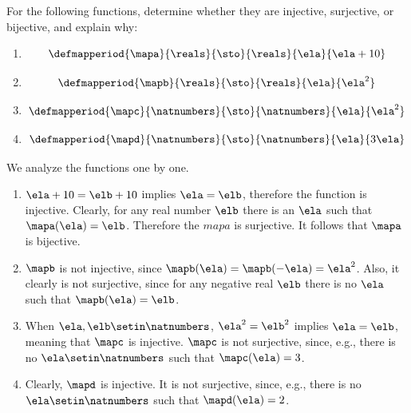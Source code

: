 \begin{exercise}
    For the following functions, determine whether they are injective, surjective, or bijective, and explain why:
    \begin{enumerate}
        \item
              \begin{equation*}
                  \defmapperiod{\mapa}{\reals}{\sto}{\reals}{\ela}{\ela + 10}
              \end{equation*}
        \item
              \begin{equation*}
                  \defmapperiod{\mapb}{\reals}{\sto}{\reals}{\ela}{\ela^2}
              \end{equation*}
        \item
              \begin{equation*}
                  \defmapperiod{\mapc}{\natnumbers}{\sto}{\natnumbers}{\ela}{\ela^2}
              \end{equation*}
        \item
              \begin{equation*}
                  \defmapperiod{\mapd}{\natnumbers}{\sto}{\natnumbers}{\ela}{3\ela}
              \end{equation*}
    \end{enumerate}
\end{exercise}

\begin{solution}
    We analyze the functions one by one.
    \begin{enumerate}
        \item $\ela + 10 = \elb + 10$ implies $\ela=\elb$, therefore the function is injective.
              Clearly, for any real number $\elb$ there is an $\ela$ such that $\mapa(\ela)=\elb$.
              Therefore the $mapa$ is surjective.
              It follows that $\mapa$ is bijective.
        \item $\mapb$ is not injective, since $\mapb(\ela)=\mapb(-\ela)=\ela^2$.
              Also, it clearly is not surjective, since for any negative real $\elb$ there is no $\ela$ such that $\mapb(\ela)=\elb$.
        \item When $\ela,\elb \setin \natnumbers$, $\ela^2=\elb^2$ implies $\ela=\elb$, meaning that $\mapc$ is injective.
              $\mapc$ is not surjective, since, e.g., there is no $\ela\setin \natnumbers$ such that $\mapc(\ela)=3$.
        \item Clearly, $\mapd$ is injective.
              It is not surjective, since, e.g., there is no $\ela\setin \natnumbers$ such that $\mapd(\ela)=2$.
    \end{enumerate}
\end{solution}

